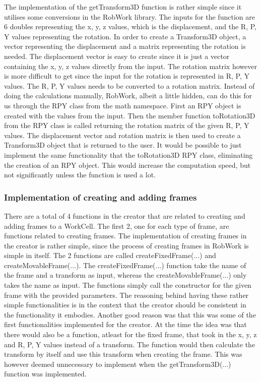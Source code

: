 The implementation of the getTransform3D function is rather simple since it utilises some conversions in the RobWork library. The inputs for the function are 6 doubles representing the x, y, z values, which is the displacement, and the R, P, Y values representing the rotation. In order to create a Transform3D object, a vector representing the displacement and a matrix representing the rotation is needed. The displacement vector is easy to create since it is just a vector containing the x, y, z values directly from the input. The rotation matrix however is more difficult to get since the input for the rotation is represented in R, P, Y values. The R, P, Y values needs to be converted to a rotation matrix. Instead of doing the calculations manually, RobWork, albeit a little hidden, can do this for us through the RPY class from the math namespace. First an RPY object is created with the values from the input. Then the member function toRotation3D from the RPY class is called returning the rotation matrix of the given R, P, Y values. The displacement vector and rotation matrix is then used to create a Transform3D object that is returned to the user. It would be possible to just implement the same functionality that the toRotation3D RPY class, eliminating the creation of an RPY object. This would increase the computation speed, but not significantly unless the function is used a lot.

\subsubsection{Implementation of creating and adding frames}
There are a total of 4 functions in the creator that are related to creating and adding frames to a WorkCell. The first 2, one for each type of frame, are functions related to creating frames. The implementation of creating frames in the creator is rather simple, since the process of creating frames in RobWork is simple in itself. The 2 functions are called createFixedFrame(...) and createMovableFrame(...). The createFixedFrame(...) function take the name of the frame and a transform as input, whereas the createMovableFrame(...) only takes the name as input. The functions simply call the constructor for the given frame with the provided parameters. The reasoning behind having these rather simple functionalities is in the context that the creator should be consistent in the functionality it embodies. Another good reason was that this was some of the first functionalities implemented for the creator. At the time the idea was that there would also be a function, atleast for the fixed frame, that took in the x, y, z and R, P, Y values instead of a transform. The function would then calculate the transform by itself and use this transform when creating the frame. This was however deemed unnecessary to implement when the getTransform3D(...) function was implemented.\\

